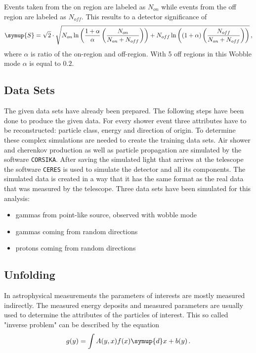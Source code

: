 Events taken from the on region are labeled as $N_{on}$ while events from the off region are labeled as $N_{off}$.
This results to a detector significance of
\begin{equation*}
  \symup{S} = \sqrt{2}\cdot \sqrt{N_{on} \ln\left( \frac{1 + \alpha}{\alpha} \left(  \frac{N_{on}}{N_{on} + N_{off}}\right)\right) + N_{off} \ln\left( (1 + \alpha) \left(\frac{N_{off}}{N_{on} + N_{off}}\right)\right)} \, ,
\end{equation*}
where $\alpha$ is ratio of the on-region and off-region.
With 5 off regions in this Wobble mode $\alpha$ is equal to $0.2$.

\subsection{Data Sets}
The given data sets have already been prepared.
The following steps have been done to produce the given data.
For every shower event three attributes have to be reconstructed: particle class, energy and direction of origin.
To determine these complex simulations are needed to create the training data sets.
Air shower and cherenkov production as well as particle propagation are simulated by the software \texttt{CORSIKA}.
After saving the simulated light that arrives at the telescope the software \texttt{CERES} is used to simulate the detector and all its components.
The simulated data is created in a way that it has the same format as the real data that was measured by the telescope.
Three data sets have been simulated for this analysis:
\begin{itemize}
  \item gammas from point-like source, observed with wobble mode
  \item gammas coming from random directions
  \item protons coming from random directions
\end{itemize}

\subsection{Unfolding}
In astrophysical measurements the parameters of interests are mostly measured indirectly.
The measured energy deposits and measured parameters are usually used to determine the attributes of the particles of interest.
This so called "inverse problem" can be described by the equation
\begin{equation}
  g(y) = \int A(y,x) f(x) \symup{d}x + b(y) \,.
  \label{eqn:convo}
\end{equation}

